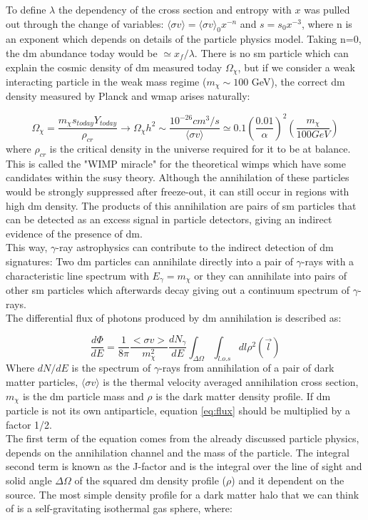 \documentclass[main.tex]{subfiles}
\begin{document}
To define $\lambda$ the dependency of the cross section and entropy with $x$ was pulled out through the change of variables: $\langle\sigma v \rangle = \langle\sigma v \rangle_{0} x^{-n}$ and $s=s_{0}x^{-3}$, where n is an exponent which depends on details of the particle physics model. Taking n=0, the \gls{dm} abundance today would be $\simeq x_{f}/\lambda$.
There is no \gls{sm} particle which can explain the cosmic density of \gls{dm} measured today $\Omega_{\chi}$, but if we consider a weak interacting particle in the weak mass regime ($m_{\chi}\sim 100$ GeV), the correct \gls{dm} density measured by Planck and \gls{wmap} arises naturally:

\begin{equation}
    \Omega_{\chi}=\frac{m_{\chi}s_{today}Y_{today}}{\rho_{cr}}\rightarrow \Omega_{\chi} h^{2}\sim \frac{10^{-26}cm^{3}/s}{\langle\sigma v\rangle} \simeq 0.1 \left(\frac{0.01}{\alpha}\right)^{2}\left( \frac{m_{\chi}}{100 GeV}\right) 
\end{equation}
where $\rho_{cr}$ is the critical density in the universe required for it to be at balance.
This is called the "WIMP miracle" for the theoretical \glspl{wimp} which have some candidates within the \gls{susy} theory. Although the annihilation of these particles would be strongly suppressed after freeze-out, it can still occur in regions with high \gls{dm} density. The products of this annihilation are pairs of \gls{sm} particles that can be detected as an excess signal in particle detectors, giving an indirect evidence of the presence of \gls{dm}.\\
This way, $\gamma$-ray astrophysics can contribute to the indirect detection of \gls{dm} signatures: Two \gls{dm} particles can annihilate directly into a pair of $\gamma$-rays with a characteristic line spectrum with $E_{\gamma}=m_\chi$ or they can annihilate into pairs of other \gls{sm} particles which afterwards decay giving out a continuum spectrum of $\gamma$-rays.\\
The differential flux of photons produced by \gls{dm} annihilation is described as:

\begin{equation}
    \frac{d \Phi}{dE}=\frac{1}{8 \pi} \frac{<\sigma v>}{m_{\chi}^2} \frac{d N_{\gamma}}{dE} \int_{\Delta\Omega}\int_{l.o.s} dl \rho^2(\vec{l})
\label{eq:flux}
\end{equation}
Where $dN/dE$ is the spectrum of $\gamma$-rays from annihilation of a pair of dark matter particles, $\langle\sigma v\rangle$ is the thermal velocity averaged annihilation cross section, $m_\chi$ is the \gls{dm} particle mass and $\rho$ is the dark matter density profile. If \gls{dm} particle is not its own antiparticle, equation \ref{eq:flux} should be multiplied by a factor 1/2. \\
The first term of the equation comes from the already discussed particle physics, depends on the annihilation channel and the mass of the particle. The integral second term is known as the J-factor and is the integral over the line of sight and solid angle $\Delta\Omega$ of the squared \gls{dm} density profile ($\rho$) and it dependent on the source. The most simple density profile for a dark matter halo that we can think of is a self-gravitating isothermal gas sphere, where:
\end{document}
